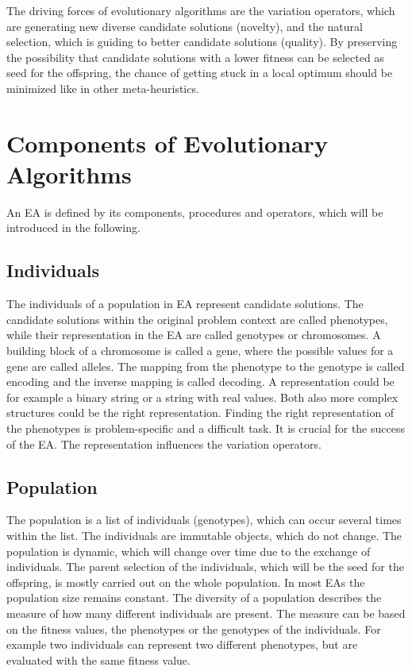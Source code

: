 The driving forces of evolutionary algorithms are the variation operators, which are generating new diverse candidate solutions (novelty), and the natural selection, which is guiding to better candidate solutions (quality)\cite{Eiben}. By preserving the possibility that candidate solutions with a lower fitness can be selected as seed for the offspring, the chance of getting stuck in a local optimum should be minimized like in other meta-heuristics.

    \section{Components of Evolutionary Algorithms}
    \label{sec:EAcomponents}
    An EA is defined by its components, procedures and operators, which will be introduced in the following.
        
        \subsection{Individuals}
        The individuals of a population in EA represent candidate solutions. The candidate solutions within the original problem context are called phenotypes, while their representation in the EA are called genotypes or chromosomes. A building block of a chromosome is called a gene, where the possible values for a gene are called alleles. The mapping from the phenotype to the genotype is called encoding and the inverse mapping is called decoding. A representation could be for example a binary string or a string with real values. Both also more complex structures could be the right representation. Finding the right representation of the phenotypes is problem-specific and a difficult task. It is crucial for the success of the EA. The representation influences the variation operators.
        
        \subsection{Population}
        The population is a list of individuals (genotypes), which can occur several times within the list. The individuals are immutable objects, which do not change. The population is dynamic, which will change over time due to the exchange of individuals. The parent selection of the individuals, which will be the seed for the offspring, is mostly carried out on the whole population. In most EAs the population size remains constant. The diversity of a population describes the measure of how many different individuals are present. The measure can be based on the fitness values, the phenotypes or the genotypes of the individuals. For example two individuals can represent two different phenotypes, but are evaluated with the same fitness value.
        
